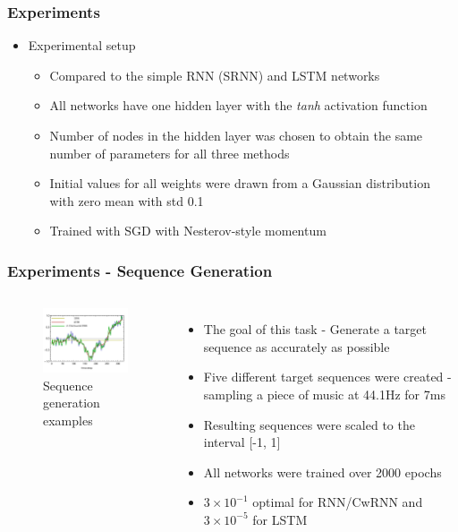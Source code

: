 \documentclass{beamer}
\begin{document}
{
   \frametitle{Experiments}
   \begin{itemize}
   	\item Experimental setup
   		\begin{itemize}
   			\item Compared to the simple RNN (SRNN) and LSTM networks
   			\item All networks have one hidden layer with the \textit{tanh} activation function
   			\item Number of nodes in the hidden layer was chosen to obtain the same number of parameters for all three methods   			
   			\item Initial values for all weights were drawn from a Gaussian distribution with zero mean with std 0.1
   			\item Trained with SGD with Nesterov-style momentum
   		\end{itemize}
   \end{itemize}
}
\frame
{
   \frametitle{Experiments - Sequence Generation}
   \begin{columns}
		\begin{figure}[ht]  
			\begin{center}
				\includegraphics[width=1.8in]{Images/cwrnn_graph.png}   
			\end{center}   
			\caption{\centering Sequence generation examples}
		\end{figure}
		\begin{itemize}		
			\item The goal of this task - Generate a target sequence as accurately as possible
			\item Five different target sequences were created - sampling a piece of music at 44.1Hz for 7ms
			\item Resulting sequences were scaled to the interval [-1, 1]
			\item All networks were trained over 2000 epochs
			\item ${3\times10^{-1}}$ optimal for RNN/CwRNN and ${3\times10^{-5}}$ for LSTM
		\end{itemize}
	\end{columns}
}
\end{document}
